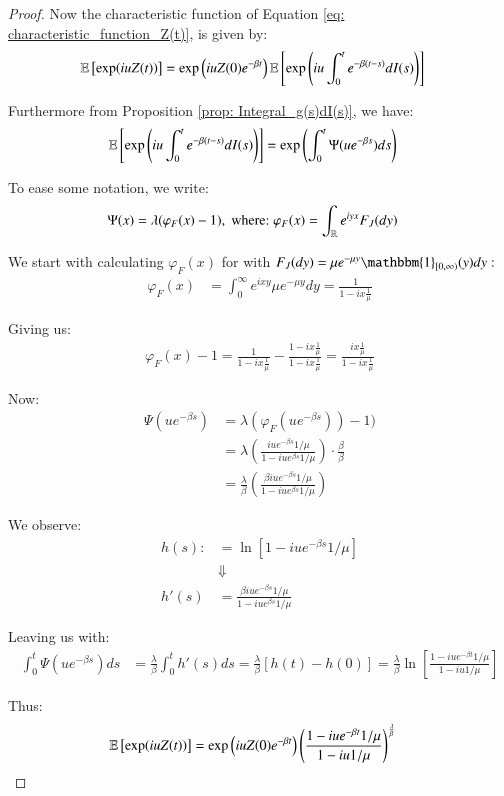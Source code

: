 \begin{proof}
Now the characteristic function of Equation \ref{eq: characteristic_function_Z(t)}, is given by: 
\begin{align*}
\mathbb{E}\left[
\exp(iu Z(t))
\right] 
&= 
\exp\left(
iuZ(0)e^{-\beta t}\right) 
\mathbb{E}\left[
\exp\left(iu\int_{0}^{t}e^{-\beta(t-s)}dI(s)\right)
\right]
\end{align*}

Furthermore from Proposition \ref{prop: Integral_g(s)dI(s)}, we have: 
\begin{align*}
\mathbb{E}\left[
\exp\left(iu\int_{0}^{t}e^{-\beta(t-s)}dI(s)\right)
\right] 
&= 
\exp\left(
\int_{0}^{t}\Psi(ue^{-\beta s})ds
\right)
\end{align*}

To ease some notation, we write:
\begin{align*}
\Psi(x) &= \lambda(\varphi_{F}(x) - 1), \;\text{where:}\; 
\varphi_{F}(x) = \int_{\mathbb{R}}e^{iyx}F_{J}(dy) 
\end{align*}

We start with calculating $\varphi_{F}(x)$ for with $F_{J}(dy) = 
\mu e^{-\mu y}\mathbbm{1}_{[0,\infty)}(y)dy:$ 
\begin{align*}
\varphi_{F}(x) &= 
\int_{0}^{\infty}e^{ixy}\mu e^{-\mu y}dy   
= \frac{1}{1-ix\frac{1}{\mu}}
\end{align*}

Giving us:
\begin{align*}
\varphi_{F}(x) - 1
= 
\frac{1}{1-ix\frac{1}{\mu}} - \frac{1-ix\frac{1}{\mu}}{1-ix\frac{1}{\mu}} 
= 
\frac{ix\frac{1}{\mu}}{1-ix\frac{1}{\mu}}
\end{align*}

Now: 
\begin{align*}
\Psi(ue^{-\beta s}) &= \lambda(\varphi_{F}(ue^{-\beta s})) -1) \\ 
&= \lambda\left(
\frac{iue^{-\beta s}1/\mu}{1-iue^{\beta s}1/\mu}
\right)\cdot \frac{\beta}{\beta} \\ 
&= 
\frac{\lambda}{\beta}\left(
\frac{\beta iue^{-\beta s}1/\mu}{1-iue^{\beta s}1/\mu}
\right)
\end{align*}

We observe: 
\begin{align*}
h(s) :&= \ln[1-iue^{-\beta s}1/\mu] \\ 
&\Downarrow \\ 
h'(s) &= \frac{\beta iue^{-\beta s}1/\mu}{1-iue^{\beta s}1/\mu} 
\end{align*}

Leaving us with: 
\begin{align*}
\int_{0}^{t}\Psi(ue^{-\beta s})ds
&= 
\frac{\lambda}{\beta}\int_{0}^{t}h'(s)ds
= 
\frac{\lambda}{\beta}[h(t)-h(0)] 
= 
\frac{\lambda}{\beta}
\ln\left[
\frac{1-iue^{-\beta t}1/\mu}{1-iu1/\mu}
\right]
\end{align*}

Thus:
\begin{align*}
\mathbb{E}\left[
\exp(iu Z(t))
\right] 
&= 
\exp\left(
iuZ(0)e^{-\beta t}\right)
\left(
\frac{
1-iue^{-\beta t}1/\mu}
{
1-iu1/\mu
}
\right)^{\frac{\lambda}{\beta}}
\end{align*}
\end{proof}

